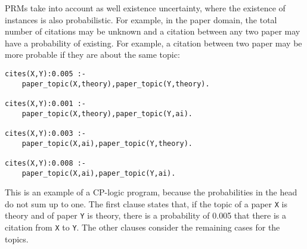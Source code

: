 \documentclass[a4paper,12pt]{article}
\begin{document}
PRMs take into account as well existence uncertainty, where the existence of instances is also probabilistic. For example, in the paper domain, the total number of citations may be unknown and  a citation between any two paper may have a probability of existing. For example, a citation between two paper may be more probable if they are about the same topic:
\begin{verbatim}
cites(X,Y):0.005 :- 
    paper_topic(X,theory),paper_topic(Y,theory).

cites(X,Y):0.001 :- 
    paper_topic(X,theory),paper_topic(Y,ai).

cites(X,Y):0.003 :- 
    paper_topic(X,ai),paper_topic(Y,theory).

cites(X,Y):0.008 :- 
    paper_topic(X,ai),paper_topic(Y,ai).
\end{verbatim}
This is an example of a CP-logic program, because the probabilities in the head do not sum up to one.
The first clause states that, if the topic of a paper \texttt{X} is theory and  of  paper \texttt{Y} is theory, there is a probability of 0.005 that there is a citation from \texttt{X} to \texttt{Y}. The other clauses consider the remaining cases for the topics.
\end{document}
